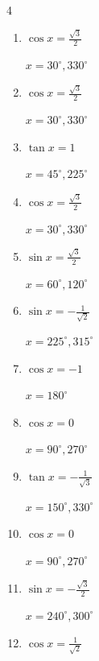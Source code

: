 \begin{multicols}{4}
\begin{enumerate}
  \item $\displaystyle \cos{x}  = \frac{\sqrt{3}}{2}$

        $\displaystyle x = 30^{\circ} , 330^{\circ}$

  \item $\displaystyle \cos{x}  = \frac{\sqrt{3}}{2}$

        $\displaystyle x = 30^{\circ} , 330^{\circ}$

  \item $\displaystyle \tan{x}  = 1$

        $\displaystyle x = 45^{\circ} , 225^{\circ}$

  \item $\displaystyle \cos{x}  = \frac{\sqrt{3}}{2}$

        $\displaystyle x = 30^{\circ} , 330^{\circ}$

  \item $\displaystyle \sin{x}  = \frac{\sqrt{3}}{2}$

        $\displaystyle x = 60^{\circ} , 120^{\circ}$

  \item $\displaystyle \sin{x}  = -\frac{1}{\sqrt{2}}$

        $\displaystyle x = 225^{\circ} , 315^{\circ}$

  \item $\displaystyle \cos{x}  = -1$

        $\displaystyle x = 180^{\circ}$

\columnbreak %

\resetques

  \item $\displaystyle \cos{x}  = 0$

        $\displaystyle x = 90^{\circ} , 270^{\circ}$

  \item $\displaystyle \tan{x}  = -\frac{1}{\sqrt{3}}$

        $\displaystyle x = 150^{\circ} , 330^{\circ}$

  \item $\displaystyle \cos{x}  = 0$

        $\displaystyle x = 90^{\circ} , 270^{\circ}$

  \item $\displaystyle \sin{x}  = -\frac{\sqrt{3}}{2}$

        $\displaystyle x = 240^{\circ} , 300^{\circ}$

  \item $\displaystyle \cos{x}  = \frac{1}{\sqrt{2}}$


\end{enumerate}
\end{multicols}
